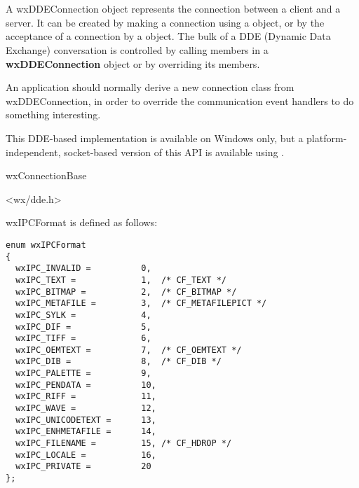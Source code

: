 \section{}\label{wxddeconnection}

A wxDDEConnection object represents the connection between a client and a
server. It can be created by making a connection using a\rtfsp
{} object, or by the acceptance of a connection by a\rtfsp
{} object. The bulk of a DDE (Dynamic Data Exchange)
conversation is controlled by
calling members in a {\bf wxDDEConnection} object or by overriding its
members.

An application should normally derive a new connection class from
wxDDEConnection, in order to override the communication event handlers
to do something interesting.

This DDE-based implementation is available on Windows only,
but a platform-independent, socket-based version
of this API is available using .


wxConnectionBase\\


<wx/dde.h>




wxIPCFormat is defined as follows:

\begin{verbatim}
enum wxIPCFormat
{
  wxIPC_INVALID =          0,
  wxIPC_TEXT =             1,  /* CF_TEXT */
  wxIPC_BITMAP =           2,  /* CF_BITMAP */
  wxIPC_METAFILE =         3,  /* CF_METAFILEPICT */
  wxIPC_SYLK =             4,
  wxIPC_DIF =              5,
  wxIPC_TIFF =             6,
  wxIPC_OEMTEXT =          7,  /* CF_OEMTEXT */
  wxIPC_DIB =              8,  /* CF_DIB */
  wxIPC_PALETTE =          9,
  wxIPC_PENDATA =          10,
  wxIPC_RIFF =             11,
  wxIPC_WAVE =             12,
  wxIPC_UNICODETEXT =      13,
  wxIPC_ENHMETAFILE =      14,
  wxIPC_FILENAME =         15, /* CF_HDROP */
  wxIPC_LOCALE =           16,
  wxIPC_PRIVATE =          20
};
\end{verbatim}


